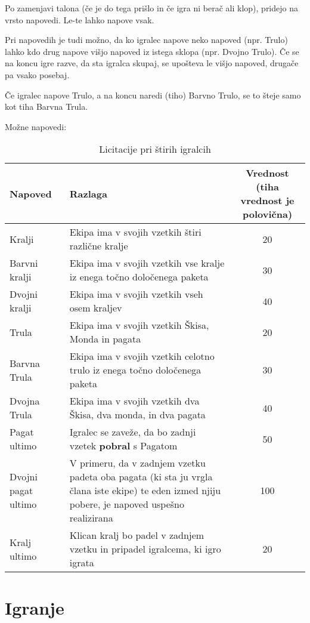 \documentclass[a4paper, ]{report}
\begin{document}
Po zamenjavi talona (če je do tega prišlo in če igra ni berač ali klop), pridejo na vrsto napovedi. Le-te lahko napove vsak.

Pri napovedih je tudi možno, da ko igralec napove neko napoved (npr. Trulo) lahko kdo drug napove višjo napoved iz istega sklopa (npr. Dvojno Trulo). Če se na koncu igre razve, da sta igralca skupaj, se upošteva le višjo napoved, drugače pa vsako posebaj.

Če igralec napove Trulo, a na koncu naredi (tiho) Barvno Trulo, se to šteje samo kot tiha Barvna Trula.

Možne napovedi:
\begin{table}
  \caption{Licitacije pri štirih igralcih}
  \begin{tabularx}{\textwidth}{lXc}
    \toprule
    \textbf{Napoved} & \textbf{Razlaga} & \parbox{25mm}{\textbf{Vrednost} \\ (tiha vrednost je polovična)} \\ \toprule
    Kralji & Ekipa ima v svojih vzetkih štiri različne kralje & 20 \\ \hline
    Barvni kralji & Ekipa ima v svojih vzetkih vse kralje iz enega točno določenega paketa & 30 \\ \hline 
    Dvojni kralji & Ekipa ima v svojih vzetkih vseh osem kraljev & 40 \\ \midrule
    Trula & Ekipa ima v svojih vzetkih Škisa, Monda in pagata & 20 \\ \hline
    Barvna Trula & Ekipa ima v svojih vzetkih celotno trulo iz enega točno določenega paketa & 30 \\ \hline 
    Dvojna Trula & Ekipa ima v svojih vzetkih dva Škisa, dva monda, in dva pagata & 40 \\ \midrule
    Pagat ultimo & Igralec se zaveže, da bo zadnji vzetek \textbf{pobral} s Pagatom & 50 \\ \hline
    Dvojni pagat ultimo & V primeru, da v zadnjem vzetku padeta oba pagata (ki sta ju vrgla člana iste ekipe) te eden izmed njiju pobere, je napoved uspešno realizirana & 100 \\ \toprule
    Kralj ultimo & Klican kralj bo padel v zadnjem vzetku in pripadel igralcema, ki igro igrata & 20 \\
    \bottomrule
  \end{tabularx}
\end{table}

\chapter{Igranje}
\end{document}
